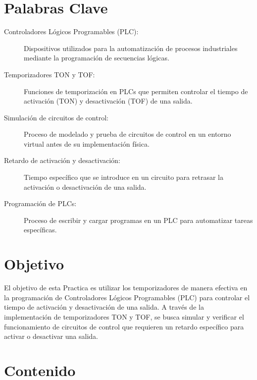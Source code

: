 \documentclass[12pt]{report}
\begin{document}
\tableofcontents
\newpage

\chapter*{Palabras Clave}
\begin{description}
  \item[Controladores Lógicos Programables (PLC):] Dispositivos utilizados para la automatización de procesos industriales mediante la programación de secuencias lógicas.
  \item[Temporizadores TON y TOF:] Funciones de temporización en PLCs que permiten controlar el tiempo de activación (TON) y desactivación (TOF) de una salida.
  \item[Simulación de circuitos de control:] Proceso de modelado y prueba de circuitos de control en un entorno virtual antes de su implementación física.
  \item[Retardo de activación y desactivación:] Tiempo específico que se introduce en un circuito para retrasar la activación o desactivación de una salida.
  \item[Programación de PLCs:] Proceso de escribir y cargar programas en un PLC para automatizar tareas específicas.
\end{description}



\newpage

\chapter*{Objetivo}
  El objetivo de esta Practica es utilizar los temporizadores de manera efectiva en la programación de Controladores Lógicos Programables (PLC) para controlar el tiempo de activación y desactivación de una salida. A través de la implementación de temporizadores TON y TOF, se busca simular y verificar el funcionamiento de circuitos de control que requieren un retardo específico para activar o desactivar una salida.

\newpage

\chapter{Contenido}
\end{document}
